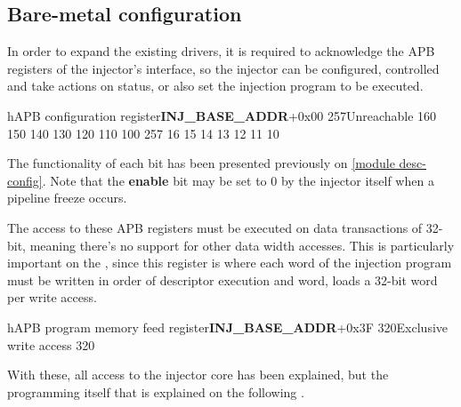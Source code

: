 \newpage
\subsection{Bare-metal configuration}
\label{software-config}

In order to expand the existing drivers, it is required to acknowledge the APB registers of the injector's interface, so the injector can be configured, 
controlled and take actions on status, or also set the injection program to be executed.

\begin{register}{h}{APB configuration register}{\textbf{INJ\_BASE\_ADDR}+0x00}
  \label{reg:APB_control}
               {25}{7}{{Unreachable}} %
        {1}{6}{0}
      {1}{5}{0}
     {1}{4}{0}
   {1}{3}{0}
        {1}{2}{0}
              {1}{1}{0}
                 {1}{0}{0}
                 {25}{7}
                  {1}{6}
                  {1}{5}
                  {1}{4}
                  {1}{3}
                  {1}{2}
                  {1}{1}
                  {1}{0}
  \reglabel{}
  \regnewline
\end{register}

The functionality of each bit has been presented previously on \autoref{module desc-config}. 
Note that the \textbf{enable} bit may be set to 0 by the injector itself when a pipeline freeze occurs.

The access to these APB registers must be executed on data transactions of 32-bit, meaning there's no support for other data width accesses.
This is particularly important on the , since this register is where each word of the injection program 
must be written in order of descriptor execution and word, loads a 32-bit word per write access.

\begin{register}{h}{APB program memory feed register}{\textbf{INJ\_BASE\_ADDR}+0x3F}
  \label{reg:APB_desc_input}
  \regfield{}                     {32}{0}{{Exclusive write access}}
                 {32}{0}
  \regnewline
\end{register}

With these, all access to the injector core has been explained, but the programming itself that is explained on the following .


